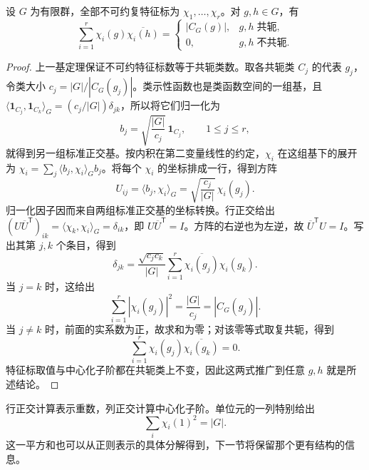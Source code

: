 \begin{theorem}[列正交]\label{b5:thm:row-column-orthogonality}
	设 \(G\) 为有限群，全部不可约复特征标为 \(\chi_1,\ldots,\chi_r\)。对 \(g,h\in G\)，有
	\[
		\sum_{i=1}^r\chi_i(g)\overline{\chi_i(h)} =
		\begin{cases}
			|C_G(g)|,&g,h\;\text{共轭},\\
			0,&g,h\;\text{不共轭}.
		\end{cases}
	\]
\end{theorem}
\begin{proof}
	上一基定理保证不可约特征标数等于共轭类数。取各共轭类 \(C_j\) 的代表 \(g_j\)，令类大小 \(c_j=|G|/|C_G(g_j)|\)。类示性函数也是类函数空间的一组基，且 \(\langle\mathbf1_{C_j},\mathbf1_{C_k}\rangle_G=(c_j/|G|)\delta_{jk}\)，所以将它们归一化为
	\[
		b_j=\sqrt{\frac{|G|}{c_j}}\,\mathbf1_{C_j},\qquad 1\le j\le r,
	\]
	就得到另一组标准正交基。按内积在第二变量线性的约定，\(\chi_i\) 在这组基下的展开为 \(\chi_i=\sum_j\langle b_j,\chi_i\rangle_G b_j\)。将每个 \(\chi_i\) 的坐标排成一行，得到方阵
	\[
		U_{ij}=\langle b_j,\chi_i\rangle_G =\sqrt{\frac{c_j}{|G|}}\,\chi_i(g_j).
	\]
	归一化因子因而来自两组标准正交基的坐标转换。行正交给出 \((U\overline U^{\mathsf T})_{ik}=\langle\chi_k,\chi_i\rangle_G=\delta_{ik}\)，即 \(U\overline U^{\mathsf T}=I\)。方阵的右逆也为左逆，故 \(\overline U^{\mathsf T}U=I\)。写出其第 \(j,k\) 个条目，得到
	\[
		\delta_{jk} =\frac{\sqrt{c_jc_k}}{|G|} \sum_{i=1}^r\overline{\chi_i(g_j)}\chi_i(g_k).
	\]
	当 \(j=k\) 时，这给出
	\[
		\sum_{i=1}^r|\chi_i(g_j)|^2 =\frac{|G|}{c_j}=|C_G(g_j)|.
	\]
	当 \(j\ne k\) 时，前面的实系数为正，故求和为零；对该零等式取复共轭，得到
	\[
		\sum_{i=1}^r\chi_i(g_j)\overline{\chi_i(g_k)}=0.
	\]
	特征标取值与中心化子阶都在共轭类上不变，因此这两式推广到任意 \(g,h\) 就是所述结论。
\end{proof}

行正交计算表示重数，列正交计算中心化子阶。单位元的一列特别给出
\[
	\sum_i\chi_i(1)^2=|G|.
\]
这一平方和也可以从正则表示的具体分解得到，下一节将保留那个更有结构的信息。
